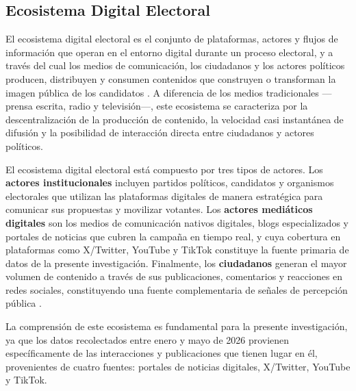 
\subsection{Ecosistema Digital Electoral}

El ecosistema digital electoral es el conjunto de plataformas, actores y flujos de información que operan en el entorno digital durante un proceso electoral, y a través del cual los medios de comunicación, los ciudadanos y los actores políticos producen, distribuyen y consumen contenidos que construyen o transforman la imagen pública de los candidatos \parencite{mc_chadwick2013hybrid}. A diferencia de los medios tradicionales —prensa escrita, radio y televisión—, este ecosistema se caracteriza por la descentralización de la producción de contenido, la velocidad casi instantánea de difusión y la posibilidad de interacción directa entre ciudadanos y actores políticos.

El ecosistema digital electoral está compuesto por tres tipos de actores. Los \textbf{actores institucionales} incluyen partidos políticos, candidatos y organismos electorales que utilizan las plataformas digitales de manera estratégica para comunicar sus propuestas y movilizar votantes. Los \textbf{actores mediáticos digitales} son los medios de comunicación nativos digitales, blogs especializados y portales de noticias que cubren la campaña en tiempo real, y cuya cobertura en plataformas como X/Twitter, YouTube y TikTok constituye la fuente primaria de datos de la presente investigación. Finalmente, los \textbf{ciudadanos} generan el mayor volumen de contenido a través de sus publicaciones, comentarios y reacciones en redes sociales, constituyendo una fuente complementaria de señales de percepción pública \parencite{mc_ceron2017social}.

La comprensión de este ecosistema es fundamental para la presente investigación, ya que los datos recolectados entre enero y mayo de 2026 provienen específicamente de las interacciones y publicaciones que tienen lugar en él, provenientes de cuatro fuentes: portales de noticias digitales, X/Twitter, YouTube y TikTok.

